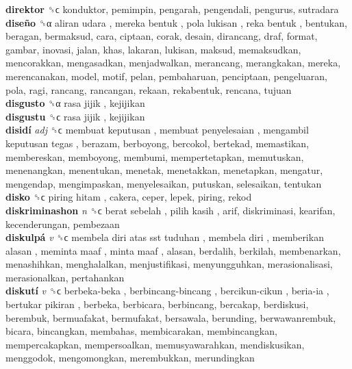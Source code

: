 \textbf{direktor} ␝ϲ  konduktor, pemimpin, pengarah, pengendali, pengurus, sutradara  \\
\textbf{diseño} ␝α   aliran udara ,  mereka bentuk ,  pola lukisan ,  reka bentuk , bentukan, beragan, bermaksud, cara, ciptaan, corak, desain, dirancang, draf, format, gambar, inovasi, jalan, khas, lakaran, lukisan, maksud, memaksudkan, mencorakkan, mengasadkan, menjadwalkan, merancang, merangkakan, mereka, merencanakan, model, motif, pelan, pembaharuan, penciptaan, pengeluaran, pola, ragi, rancang, rancangan, rekaan, rekabentuk, rencana, tujuan  \\
\textbf{disgusto} ␝α   rasa jijik , kejijikan  \\
\textbf{disgustu} ␝ϲ   rasa jijik , kejijikan  \\
\textbf{disidí} \emph{adj}  ␝ϲ   membuat keputusan ,  membuat penyelesaian ,  mengambil keputusan tegas , berazam, berboyong, bercokol, bertekad, memastikan, membereskan, memboyong, membumi, mempertetapkan, memutuskan, menenangkan, menentukan, menetak, menetakkan, menetapkan, mengatur, mengendap, mengimpaskan, menyelesaikan, putuskan, selesaikan, tentukan  \\
\textbf{disko} ␝ϲ   piring hitam , cakera, ceper, lepek, piring, rekod  \\
\textbf{diskriminashon} \emph{n}  ␝ϲ   berat sebelah ,  pilih kasih , arif, diskriminasi, kearifan, kecenderungan, pembezaan  \\
\textbf{diskulpá} \emph{v}  ␝ϲ   membela diri  atas sst tuduhan ,  membela diri ,  memberikan alasan ,  meminta maaf ,  minta maaf , alasan, berdalih, berkilah, membenarkan, menashihkan, menghalalkan, menjustifikasi, menyungguhkan, merasionalisasi, merasionalkan, pertahankan  \\
\textbf{diskutí} \emph{v}  ␝ϲ   berbeka-beka ,  berbincang-bincang ,  bercikun-cikun ,  beria-ia ,  bertukar pikiran , berbeka, berbicara, berbincang, bercakap, berdiskusi, berembuk, bermuafakat, bermufakat, bersawala, berunding, berwawanrembuk, bicara, bincangkan, membahas, membicarakan, membincangkan, mempercakapkan, mempersoalkan, memusyawarahkan, mendiskusikan, menggodok, mengomongkan, merembukkan, merundingkan  \\
